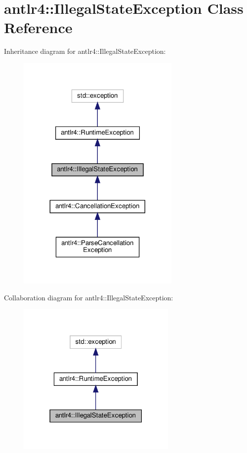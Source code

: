 \hypertarget{classantlr4_1_1IllegalStateException}{}\section{antlr4\+:\+:Illegal\+State\+Exception Class Reference}
\label{classantlr4_1_1IllegalStateException}


Inheritance diagram for antlr4\+:\+:Illegal\+State\+Exception\+:
\nopagebreak
\begin{figure}[H]
\begin{center}
\leavevmode
\includegraphics[width=224pt]{classantlr4_1_1IllegalStateException__inherit__graph}
\end{center}
\end{figure}


Collaboration diagram for antlr4\+:\+:Illegal\+State\+Exception\+:
\nopagebreak
\begin{figure}[H]
\begin{center}
\leavevmode
\includegraphics[width=219pt]{classantlr4_1_1IllegalStateException__coll__graph}
\end{center}
\end{figure}
